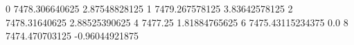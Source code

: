 0 7478.306640625 2.87548828125
1 7479.267578125 3.83642578125
2 7478.31640625 2.88525390625
4 7477.25 1.81884765625
6 7475.43115234375 0.0
8 7474.470703125 -0.96044921875
